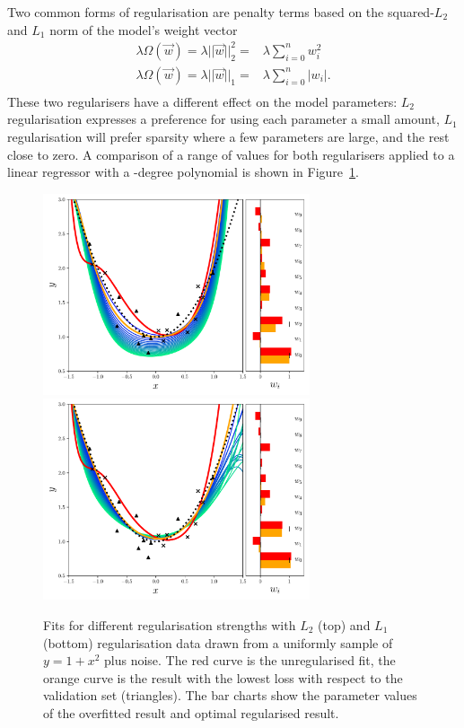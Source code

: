 Two common forms of regularisation are penalty terms based on the squared-$L_{2}$ and $L_{1}$ norm of the model's weight vector
\begin{equation}
    \begin{split}
        \lambda\Omega(\vec{w}) = \lambda||\vec{w}||^{2}_{2} =& \lambda\sum_{i=0}^{n}w_{i}^{2} \\
        \lambda\Omega(\vec{w}) = \lambda||\vec{w}||_{1} =& \lambda\sum_{i=0}^{n}|w_{i}|. \\
    \end{split}
\end{equation}
These two regularisers have a different effect on the model parameters: $L_{2}$ regularisation expresses a preference for using each parameter a small amount, $L_{1}$ regularisation will prefer sparsity where a few parameters are large, and the rest close to zero. 
A comparison of a range of values for both regularisers applied to a linear regressor with a -degree polynomial is shown in Figure~\ref{fig:machine_learning:reg_example}. 
\begin{figure}[h!]
    \begin{center}
        \includegraphics[width=0.7\textwidth]{figures/machine_learning/L2_reg_plot.pdf}
        \includegraphics[width=0.7\textwidth]{figures/machine_learning/L1_reg_plot.pdf}
    \end{center}
    \caption{Fits for different regularisation strengths with $L_{2}$ (top) and $L_{1}$ (bottom) regularisation data drawn from a uniformly sample of $y=1+x^{2}$ plus noise. The red curve is the unregularised fit, the orange curve is the result with the lowest loss with respect to the validation set (triangles). The bar charts show the parameter values of the overfitted result and optimal regularised result.} 
        \label{fig:machine_learning:reg_example}
\end{figure}

